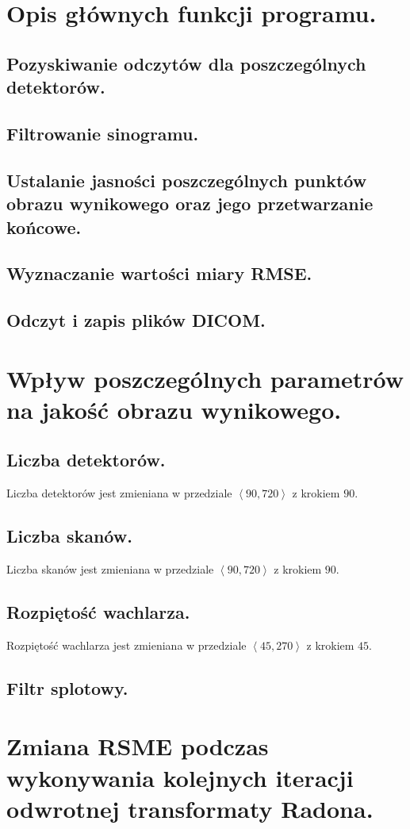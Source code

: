 \documentclass[paper=a4, fontsize=11pt]{scrartcl}
\begin{document}
	\section{Opis głównych funkcji programu.}
	\subsection{Pozyskiwanie odczytów dla poszczególnych detektorów.}
	\subsection{Filtrowanie sinogramu.}
	\subsection{Ustalanie jasności poszczególnych punktów obrazu wynikowego oraz jego przetwarzanie końcowe.}
	\subsection{Wyznaczanie wartości miary RMSE.}
	\subsection{Odczyt i zapis plików DICOM.}
	
	\section{Wpływ poszczególnych parametrów na jakość obrazu wynikowego.}
	\subsection{Liczba detektorów.}
	
	Liczba detektorów jest zmieniana w przedziale $\left<90, 720 \right>$ z krokiem $90$.
	\subsection{Liczba skanów.}
	
	Liczba skanów jest zmieniana w przedziale $\left<90, 720 \right>$ z krokiem $90$.
	\subsection{Rozpiętość wachlarza.}
	
	Rozpiętość wachlarza jest zmieniana w przedziale $\left<45, 270 \right>$ z krokiem $45$.
	\subsection{Filtr splotowy.}
	
	\section{Zmiana RSME podczas wykonywania kolejnych iteracji odwrotnej transformaty Radona.}
\end{document}
